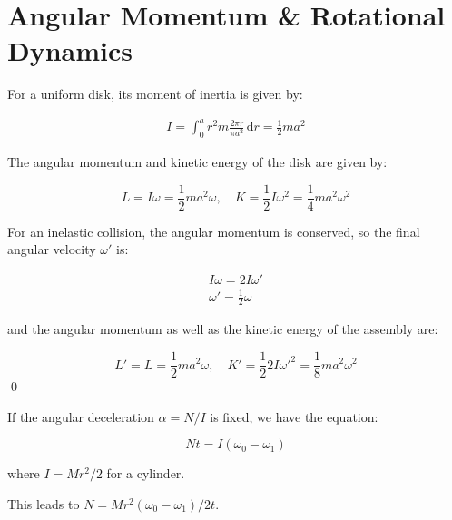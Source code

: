 \documentclass[12pt]{article}
\begin{document}



\pagebreak
\section*{Angular Momentum \& Rotational Dynamics}


For a uniform disk, its moment of inertia is given by:

\begin{equation}
\begin{split}
    I = \int_{0}^{a} r^{2} m \frac{2\pi r}{\pi a^{2}} \, \mathrm{d}r = \frac{1}{2} m a^{2}
\end{split}
\end{equation}

The angular momentum and kinetic energy of the disk are given by:

\begin{equation}
    L = I \omega = \frac{1}{2} m a^{2} \omega, \quad K = \frac{1}{2} I \omega^{2} = \frac{1}{4} m a^{2} \omega^{2}
\end{equation}

For an inelastic collision, the angular momentum is conserved, so the final angular velocity $\omega'$ is:

\begin{equation}
\begin{split}
    I \omega = 2I \omega' \\
    \omega' = \frac{1}{2} \omega
\end{split}
\end{equation}

and the angular momentum as well as the kinetic energy of the assembly are:

\begin{equation}
    L' = L = \frac{1}{2} m a^{2} \omega, \quad K' = \frac{1}{2} 2I \omega'^{2} = \frac{1}{8} m a^{2} \omega^{2}
\end{equation}
\qed



If the angular deceleration $\alpha = N/I$ is fixed, we have the equation:

\begin{equation}
    N t = I (\omega_{0} - \omega_{1})
\end{equation}

where $I = Mr^{2}/2$ for a cylinder.

This leads to $N = Mr^{2}(\omega_{0} - \omega_{1})/2t$.
\end{document}
